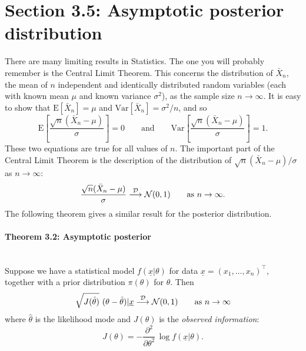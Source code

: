 \clearpage


\section{Section 3.5: Asymptotic posterior distribution}
There are many limiting results in Statistics. The one you will probably remember is the Central Limit Theorem. This concerns the distribution of $\bar X_n$, the mean of $n$ independent and identically distributed random variables (each with known mean $\mu$ and known variance $\sigma^2$), as the sample size $n\to\infty$. It is easy to show that $\text{E}[\bar X_n]=\mu$ and $\text{Var}[\bar X_n]=\sigma^2/n$, and so 
$$
\text{E}\left[\frac{\sqrt{n}(\bar{X}_{n}-\mu)}{\sigma}\right] = 0 \qquad \mathrm{and} \qquad \text{Var}\left[\frac{\sqrt{n}(\bar{X}_{n}-\mu)}{\sigma}\right]=1.
$$
These two equations are true for all values of $n$.  The important part of the Central Limit Theorem is the description of the distribution of $\sqrt{n}(\bar{X}_{n}-\mu)/\sigma$ as $n \to \infty$: 
\begin{equation*}
\frac{\sqrt{n}(\bar X_n-\mu)}{\sigma}\stackrel{\cal D} \longrightarrow
\mathcal{N}(0,1)\quad\quad\text{as }n\to\infty.
\end{equation*}
The following theorem gives a similar result for the posterior
distribution. 

\paragraph{Theorem 3.2: Asymptotic posterior}{~\\ 
Suppose we have a statistical model $f(\underline{x}|\theta)$ for data
$\underline{x} = (x_1, \ldots, x_n)^\top$, together with a prior distribution $\pi(\theta)$ for
$\theta$. Then
$$\sqrt{J(\hat{\theta})}~(\theta-\hat{\theta})|\underline{x} \stackrel{\cal D}
  \longrightarrow \mathcal{N}(0,1)
  \quad\quad\text{as }n\to\infty $$
    where $\hat{\theta}$ is the likelihood mode and $J(\theta)$
    is the \emph{observed information}:
    $$ J(\theta)=-\frac{\partial^2}{\partial\theta^2}\, \log f(\underline{x}|\theta).$$}
\clearpage
